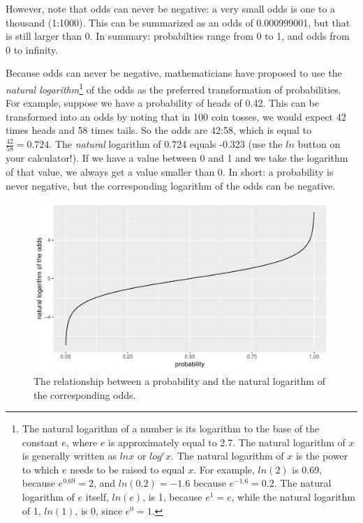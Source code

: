 \documentclass[]{book}\usepackage[]{graphicx}\usepackage[]{color}
\makeatletter
\def\maxwidth{ %
  \ifdim\Gin@nat@width>\linewidth
    \linewidth
  \else
    \Gin@nat@width
  \fi
}
\newenvironment{knitrout}{}{} %
\makeatother
\begin{document}
However, note that odds can never be negative: a very small odds is one to a thousand (1:1000). This can be summarized as an odds of 0.000999001, but that is still larger than 0. In summary: probabilties range from 0 to 1, and odds from 0 to infinity.

Because odds can never be negative, mathematicians have proposed to use the \textit{natural logarithm}\footnote{The natural logarithm of a number is its logarithm to the base of the constant $e$, where $e$ is approximately equal to 2.7. The natural logarithm of $x$ is generally written as
$ln x$ or $log^e x$. The natural logarithm of $x$ is the power to which $e$ needs to be raised to equal $x$. For example, $ln(2)$ is 0.69, because $e^{0.69} = 2$, and $ln(0.2)=-1.6$ because $e^{-1.6}=0.2$. The natural logarithm of $e$ itself, $ln(e)$, is 1, because $e^1 = e$, while the natural logarithm of 1, $ln(1)$, is 0, since $e^0 = 1$.} of the odds  as the preferred transformation of probabilities. For example, suppose we have a probability of heads of 0.42. This can be transformed into an odds by noting that in 100 coin tosses, we would expect 42 times heads and 58 times tails. So the odds are 42:58, which is equal to $\frac{42}{58}=0.724$. The \textit{natural} logarithm of 0.724 equals -0.323 (use the $ln$ button on your calculator!). If we have a value between 0 and 1 and we take the logarithm of that value, we always get a value smaller than 0. In short: a probability is never negative, but the corresponding logarithm of the odds can be negative.




\begin{knitrout}
\color{fgcolor}\begin{figure}

{\centering \includegraphics[width=\maxwidth]{figure/gen_8-1} 

}

\caption[The relationship between a probability and the natural logarithm of the corresponding odds]{The relationship between a probability and the natural logarithm of the corresponding odds.}\label{fig:gen_8}
\end{figure}


\end{knitrout}
\end{document}
